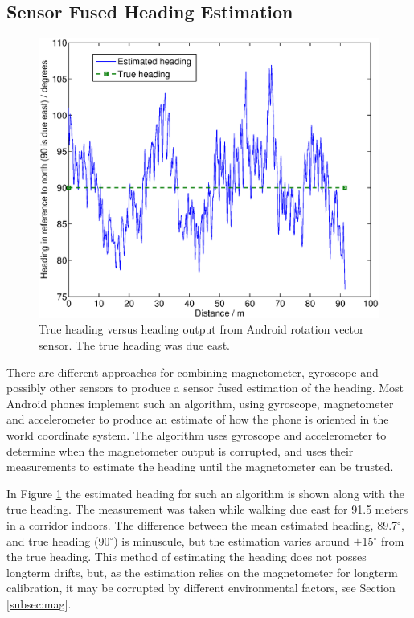 \documentclass{LTHthesis}
\begin{document}
\subsection{Sensor Fused Heading Estimation}
%
\begin{figure}[!hbt]

\includegraphics[width=1\textwidth ]{images/kinematic/rot_test}
\caption{True heading versus heading output from Android rotation vector sensor. The true heading was due east.}\label{rot_test}
\end{figure}
%
There are different approaches for combining magnetometer, gyroscope and possibly other sensors to produce a sensor fused estimation of the heading. Most Android phones implement such an algorithm, using gyroscope, magnetometer and accelerometer to produce an estimate of how the phone is oriented in the world coordinate system. The algorithm uses gyroscope and accelerometer to determine when the magnetometer output is corrupted, and uses their measurements to estimate the heading until the magnetometer can be trusted. 

In Figure \ref{rot_test} the estimated heading for such an algorithm is shown along with the true heading. The measurement was taken while walking due east for 91.5 meters in a corridor indoors. The difference between the mean estimated heading, 89.7$^\circ$, and true heading (90$^\circ$) is minuscule, but the estimation varies around $\pm$15$^\circ$ from the true heading. This method of estimating the heading does not posses longterm drifts, but, as the estimation relies on the magnetometer for longterm calibration, it may be corrupted by different environmental factors, see Section \ref{subsec:mag}. 
%
\end{document}
